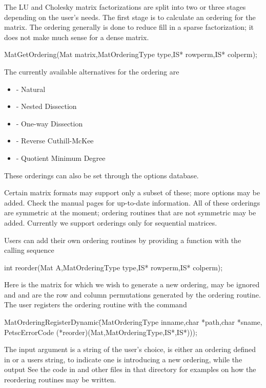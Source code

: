 {{{The LU and Cholesky 
matrix factorizations are split into 
two or three stages depending on the user's needs. The first stage is 
to calculate an ordering for the matrix.  The ordering generally is 
done to reduce fill in a sparse factorization; it does not make much 
sense for a dense matrix.  
\begin{tabbing}
  MatGetOrdering(Mat matrix,MatOrderingType type,IS* rowperm,IS* colperm); 
\end{tabbing}
The currently available alternatives for the ordering  are 
\begin{itemize}
\item {} - Natural
\item {} - Nested Dissection
\item {} - One-way Dissection
\item {} - Reverse Cuthill-McKee
\item {} - Quotient Minimum Degree
\end{itemize}
These orderings can also be set through the options database.

Certain matrix formats may support only a subset of these; more options may 
be added. Check the manual pages for up-to-date information. All of these orderings are 
symmetric at the moment; ordering routines that are 
not symmetric may be added. Currently we support orderings only for 
sequential matrices.

Users can add their own ordering routines 
by providing a function with the calling sequence
\begin{tabbing}
   int reorder(Mat A,MatOrderingType type,IS* rowperm,IS* colperm);
\end{tabbing}
Here  is the matrix for which we wish to generate a new ordering, 
 may be ignored and  and  are the row
and column permutations generated by the ordering routine.
The user registers the ordering routine
with the command
\begin{tabbing}
  MatOrderingRegisterDynamic\=(MatOrderingType inname,char *path,char *sname,\\
                             \>PetscErrorCode (*reorder)(Mat,MatOrderingType,IS*,IS*)));
\end{tabbing}
The  
input argument  is a string of the user's choice,  is either 
an ordering defined in  or a users string,
to indicate one is introducing a new ordering, while the output
See the code in  and other files in that 
directory for examples on how the reordering routines may be written.

}}}
